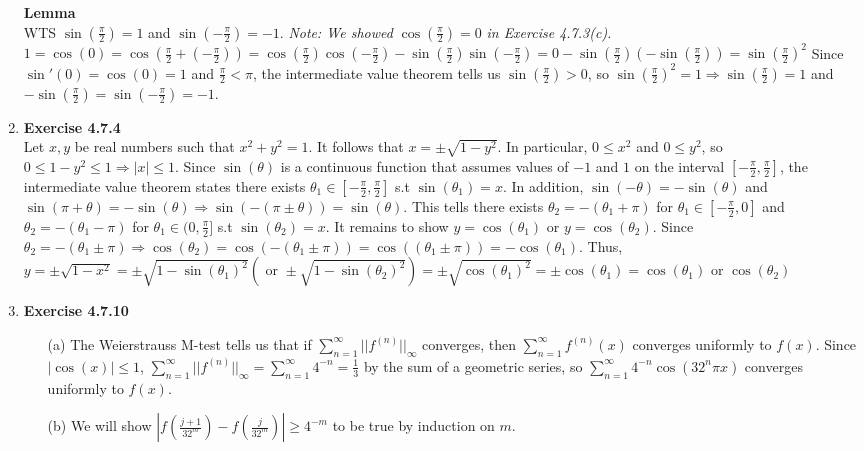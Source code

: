 \documentclass[10pt]{article}
\begin{document}
\begin{enumerate}[label=Problem \arabic*.]
    \textbf{Lemma}\\
    WTS $\sin(\frac{\pi}{2})=1$ and $\sin(-\frac{\pi}{2})=-1$. \textit{Note: We showed }$\cos(\frac{\pi}{2})=0$ \textit{ in Exercise 4.7.3(c).}\\
    $1=\cos(0)=\cos(\frac{\pi}{2}+(-\frac{\pi}{2}))=\cos(\frac{\pi}{2})\cos(-\frac{\pi}{2})-\sin(\frac{\pi}{2})\sin(-\frac{\pi}{2})=0-\sin(\frac{\pi}{2})(-\sin(\frac{\pi}{2}))=\sin(\frac{\pi}{2})^2$
    Since $\sin'(0)=\cos(0)=1$ and $\frac{\pi}{2}<\pi$, the intermediate value theorem tells us $\sin(\frac{\pi}{2})>0$, so $\sin(\frac{\pi}{2})^2=1\Rightarrow\sin(\frac{\pi}{2})=1$ and $-\sin(\frac{\pi}{2})=\sin(-\frac{\pi}{2})=-1$. 
    \item \textbf{Exercise 4.7.4}\\
    Let $x,y$ be real numbers such that $x^2+y^2=1$. It follows that $x=\pm\sqrt{1-y^2}$. In particular, $0\le x^2$ and $0\le y^2$, so $0\le1-y^2\le1\Rightarrow|x|\le1$. 
    Since $\sin(\theta)$ is a continuous function that assumes values of $-1$ and $1$ on the interval $[-\frac{\pi}{2},\frac{\pi}{2}]$, the intermediate value theorem states there exists $\theta_1\in[-\frac{\pi}{2},\frac{\pi}{2}]$ s.t $\sin(\theta_1)=x$. 
    In addition, $\sin(-\theta)=-\sin(\theta)$ and $\sin(\pi+\theta)=-\sin(\theta)\Rightarrow\sin(-(\pi\pm\theta))=\sin(\theta)$. 
    This tells there exists $\theta_2=-(\theta_1+\pi)$ for $\theta_1\in[-\frac{\pi}{2},0]$ and $\theta_2=-(\theta_1-\pi)$ for $\theta_1\in(0,\frac{\pi}{2}]$ s.t $\sin(\theta_2)=x$. 
    It remains to show $y=\cos(\theta_1)$ or $y=\cos(\theta_2)$. Since $\theta_2=-(\theta_1\pm\pi)\Rightarrow\cos(\theta_2)=\cos(-(\theta_1\pm\pi))=\cos((\theta_1\pm\pi))=-\cos(\theta_1)$.
    Thus, $y=\pm\sqrt{1-x^2}=\pm\sqrt{1-\sin(\theta_1)^2}(\text{ or }\pm\sqrt{1-\sin(\theta_2)^2})=\pm\sqrt{\cos(\theta_1)^2}=\pm\cos(\theta_1)=\cos(\theta_1)$ or $\cos(\theta_2)$
    \item \textbf{Exercise 4.7.10}
    \begin{itemize}
        \item [(a)] The Weierstrauss M-test tells us that if $\displaystyle\sum_{n=1}^{\infty}||f^{(n)}||_\infty$ converges, then $\displaystyle\sum_{n=1}^{\infty}f^{(n)}(x)$ converges uniformly to $f(x)$. 
        Since $|\cos(x)|\le1$, $\displaystyle\sum_{n=1}^{\infty}||f^{(n)}||_\infty=\sum_{n=1}^{\infty}4^{-n}=\frac{1}{3}$ by the sum of a geometric series, so $\sum_{n=1}^{\infty}4^{-n}\cos(32^n\pi x)$ converges uniformly to $f(x)$.
        \item [(b)] We will show $|f(\frac{j+1}{32^m})-f(\frac{j}{32^m})|\ge4^{-m}$ to be true by induction on $m$.

\end{itemize}
\end{enumerate}
\end{document}
